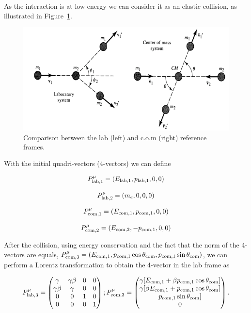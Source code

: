 \documentclass[10pt,swedish, openany]{book}
\begin{document}
As the interaction is at low energy we can consider it as an elastic collision, as illustrated in Figure~\ref{fig:lab}.
\begin{figure}[H]
\includegraphics[scale=0.3]{lab.png}
\centering
\caption{Comparison between the lab (left) and c.o.m (right) reference frames.}
\label{fig:lab}
\end{figure}

With the initial quadri-vectors (4-vectors) we can define

\begin{equation}
    P^{\mu}_{\rm lab,1} = (E_{\rm lab,1},p_{\rm lab,1},0,0)
\end{equation}

\begin{equation}
    P^{\mu}_{\rm lab,2} = (m_e,0,0,0)
\end{equation}

\begin{equation}
    P^{\mu}_{\rm com,1} = (E_{\rm com,1},p_{\rm com,1},0,0)
\end{equation}

\begin{equation}
    P^{\mu}_{\rm com,2} = (E_{\rm com,2},-p_{\rm com,1},0,0)
\end{equation}

After the collision, using energy conservation and the fact that the norm of the 4-vectors are equals, $P^{\mu}_{\rm com,3} = (E_{\rm com,1},p_{\rm com,1}\cos{\theta_{\rm com}},p_{\rm com,1}\sin{\theta_{\rm com}})$, we can perform a Lorentz transformation to obtain the 4-vector in the lab frame as

\begin{equation}
P^{\mu}_{\rm lab,3} = \begin{pmatrix}
\gamma & \gamma\beta & 0 & 0 \\
\gamma\beta & \gamma & 0 & 0\\
0 & 0 & 1 & 0\\
0 & 0 & 0 & 1
\end{pmatrix};
P^{\mu}_{\rm com,3} = \begin{pmatrix}
\gamma[E_{\rm com,1}+\beta p_{\rm com,1}\cos{\theta_{\rm com}}]\\
\gamma[\beta E_{\rm com,1}+ p_{\rm com,1}\cos{\theta_{\rm com}}]\\
p_{\rm com,1}\sin{\theta_{\rm com}}]\\
0
\end{pmatrix}.
\end{equation}
\end{document}
